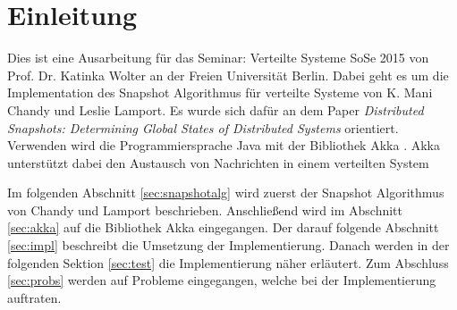 \section{Einleitung}
\label{sec:einl}
Dies ist eine Ausarbeitung für das Seminar: Verteilte Systeme SoSe 2015 von
Prof. Dr. Katinka Wolter an der Freien Universität Berlin.  Dabei geht es um
die Implementation des Snapshot Algorithmus für verteilte Systeme von K. Mani
Chandy und Leslie Lamport. Es wurde sich dafür an dem Paper \textit{Distributed
Snapshots: Determining Global States of Distributed Systems}  \cite{snapshotChandyLamport} orientiert. Verwenden wird die
Programmiersprache Java \cite{java} mit der Bibliothek Akka \cite{akka}.
Akka unterstützt dabei den Austausch von Nachrichten in einem verteilten System

Im folgenden Abschnitt \ref{sec:snapshotalg} wird zuerst der Snapshot 
Algorithmus von Chandy und Lamport beschrieben. Anschließend wird im Abschnitt
\ref{sec:akka} auf die Bibliothek Akka eingegangen. Der darauf folgende 
Abschnitt \ref{sec:impl} beschreibt die Umsetzung der Implementierung. Danach
werden in der folgenden Sektion \ref{sec:test} die Implementierung näher
erläutert. Zum Abschluss \ref{sec:probs} werden auf Probleme eingegangen, 
welche bei der Implementierung auftraten.
